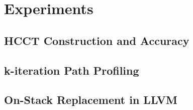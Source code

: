 \chapter{Experiments}

\section{HCCT Construction and Accuracy}

\section{k-iteration Path Profiling}

\section{On-Stack Replacement in LLVM}